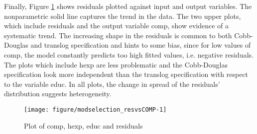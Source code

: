\documentclass[12pt,a4paper]{article}\usepackage[]{graphicx}\usepackage[]{color}
\newenvironment{knitrout}{}{} %
\begin{document}
Finally, Figure \ref{fig:modselection_resvsCOMP} shows residuals plotted against input and output variables. The nonparametric solid line captures the trend in the data. The two upper plots, which include residuals and the output variable comp, show evidence of a systematic trend. The increasing shape in the residuals is common to both Cobb-Douglas and translog specification and hints to some bias, since for low values of comp, the model constantly predicts too high fitted values, i.e. negative residuals. The plots which include hexp are less problematic and the Cobb-Douglas specification look more independent than the translog specification with respect to the variable educ. In all plots, the change in spread of the residuals' distribution suggests heterogeneity.

\begin{knitrout}
\color{fgcolor}\begin{figure}[htbp]

{\centering \texttt{[image: figure/modselection\_resvsCOMP-1]} 

}

\caption[Plot of comp, hexp, educ and residuals]{Plot of comp, hexp, educ and residuals}\label{fig:modselection_resvsCOMP}
\end{figure}


\end{knitrout}
\end{document}
